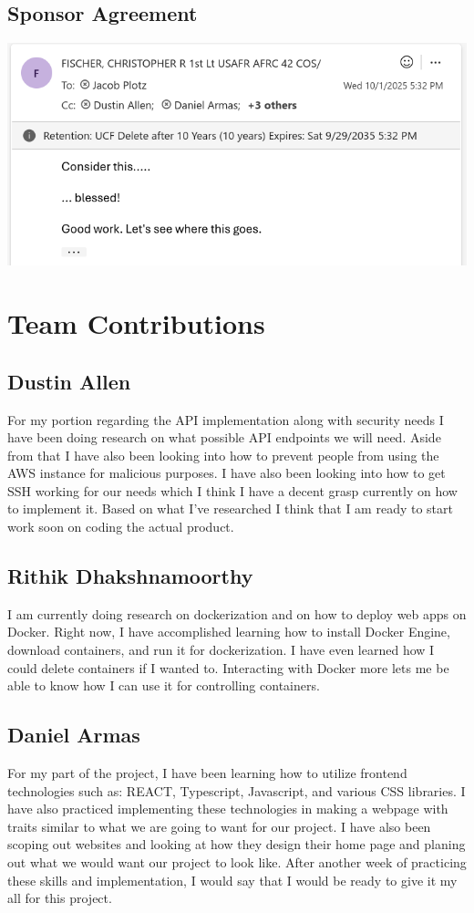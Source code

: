 \documentclass[12pt]{article}
\begin{document}
\subsection{Sponsor Agreement}
\includegraphics[width=\linewidth]{sponsor-email-screenshot.png}

\section{Team Contributions}
\subsection{Dustin Allen}
For my portion regarding the API implementation along with security needs I have been doing research on what possible API endpoints we will need. Aside from that I have also been looking into how to prevent people from using the AWS instance for malicious purposes. I have also been looking into how to get SSH working for our needs which I think I have a decent grasp currently on how to implement it. Based on what I’ve researched I think that I am ready to start work soon on coding the actual product.

\subsection{Rithik Dhakshnamoorthy}
I am currently doing research on dockerization and on how to deploy web apps on Docker. Right now, I have accomplished learning how to install Docker Engine, download containers, and run it for dockerization. I have even learned how I could delete containers if I wanted to. Interacting with Docker more lets me be able to know how I can use it for controlling containers.

\subsection{Daniel Armas}
For my part of the project, I have been learning how to utilize frontend technologies such as: REACT, Typescript, Javascript, and various CSS libraries. I have also practiced implementing these technologies in making a webpage with traits similar to what we are going to want for our project. I have also been scoping out websites and looking at how they design their home page and planing out what we would want our project to look like. After another week of practicing these skills and implementation, I would say that I would be ready to give it my all for this project.
\end{document}
